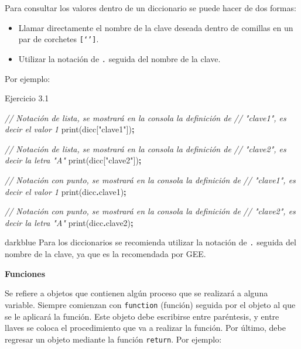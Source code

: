 \documentclass[
  12pt,
  letterpaper,
  twoside]{book}
\newenvironment{Shaded}{\begin{snugshade}}{\end{snugshade}}
\newcommand{\AttributeTok}[1]{\textcolor[rgb]{0.77,0.63,0.00}{#1}}
\newcommand{\CommentTok}[1]{\textcolor[rgb]{0.56,0.35,0.01}{\textit{#1}}}
\newcommand{\FunctionTok}[1]{\textcolor[rgb]{0.00,0.00,0.00}{#1}}
\newcommand{\NormalTok}[1]{#1}
\newcommand{\OperatorTok}[1]{\textcolor[rgb]{0.81,0.36,0.00}{\textbf{#1}}}
\newcommand{\StringTok}[1]{\textcolor[rgb]{0.31,0.60,0.02}{#1}}
\providecommand{\tightlist}{%
  \setlength{\itemsep}{0pt}\setlength{\parskip}{0pt}}
\begin{document}
Para consultar los valores dentro de un diccionario se puede hacer de dos formas:

\begin{itemize}
\tightlist
\item
  Llamar directamente el nombre de la clave deseada dentro de comillas en un par de corchetes \texttt{{[}‘’{]}}.
\item
  Utilizar la notación de \texttt{.} seguida del nombre de la clave.
\end{itemize}

Por ejemplo:

Ejercicio 3.1

\begin{Shaded}
\begin{Highlighting}[]
\CommentTok{// Notación de lista, se mostrará en la consola la definición de }
\CommentTok{// "clave1", es decir el valor 1 }
\FunctionTok{print}\NormalTok{(dicc[}\StringTok{"clave1"}\NormalTok{])}\OperatorTok{;} 

\CommentTok{// Notación de lista, se mostrará en la consola la definición de }
\CommentTok{// "clave2", es decir la letra "A"}
\FunctionTok{print}\NormalTok{(dicc[}\StringTok{"clave2"}\NormalTok{])}\OperatorTok{;}  

\CommentTok{// Notación con punto, se mostrará en la consola la definición de }
\CommentTok{// "clave1", es decir el valor 1 }
\FunctionTok{print}\NormalTok{(dicc}\OperatorTok{.}\AttributeTok{clave1}\NormalTok{)}\OperatorTok{;}  

\CommentTok{// Notación con punto, se mostrará en la consola la definición de }
\CommentTok{// "clave2", es decir la letra "A"}
\FunctionTok{print}\NormalTok{(dicc}\OperatorTok{.}\AttributeTok{clave2}\NormalTok{)}\OperatorTok{;}  
\end{Highlighting}
\end{Shaded}

\begin{bluebox2}

\begin{awesomeblock}{5pt}{\faLightbulb}{darkblue}
Para los diccionarios se recomienda utilizar la notación de \texttt{.} seguida del nombre de la clave, ya que es la recomendada por GEE.

\end{awesomeblock}

\end{bluebox2}

\textbf{Funciones}

Se refiere a objetos que contienen algún proceso que se realizará a alguna variable. Siempre comienzan con \texttt{function} (función) seguida por el objeto al que se le aplicará la función. Este objeto debe escribirse entre paréntesis, y entre llaves se coloca el procedimiento que va a realizar la función. Por último, debe regresar un objeto mediante la función \texttt{return}. Por ejemplo:
\end{document}
